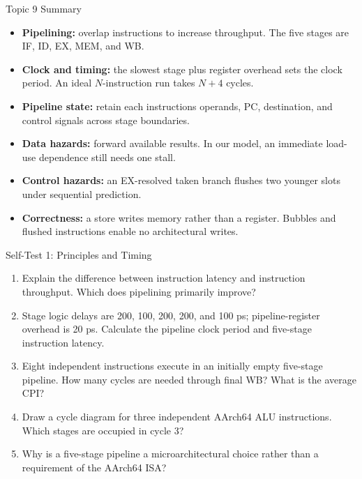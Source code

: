 \documentclass[aspectratio=169,11pt,t]{beamer}
\newcommand{\key}[1]{\textbf{#1}}
\begin{document}
\begin{frame}{Topic 9 Summary}

\begin{itemize}\setlength{\itemsep}{6pt}
  \item \key{Pipelining:} overlap instructions to increase throughput. The five stages are IF, ID, EX, MEM, and WB.
  \item \key{Clock and timing:} the slowest stage plus register overhead sets the clock period. An ideal $N$-instruction run takes $N+4$ cycles.
  \item \key{Pipeline state:} retain each instruction\textquotesingle s operands, PC, destination, and control signals across stage boundaries.
  \item \key{Data hazards:} forward available results. In our model, an immediate load-use dependence still needs one stall.
  \item \key{Control hazards:} an EX-resolved taken branch flushes two younger slots under sequential prediction.
  \item \key{Correctness:} a store writes memory rather than a register. Bubbles and flushed instructions enable no architectural writes.
\end{itemize}

\end{frame}

\begin{frame}{Self-Test 1: Principles and Timing}

\begin{enumerate}\setlength{\itemsep}{10pt}
\item Explain the difference between instruction latency and instruction throughput. Which does pipelining primarily improve?
\item Stage logic delays are 200, 100, 200, 200, and 100 ps; pipeline-register overhead is 20 ps. Calculate the pipeline clock period and five-stage instruction latency.
\item Eight independent instructions execute in an initially empty five-stage pipeline. How many cycles are needed through final WB? What is the average CPI?
\item Draw a cycle diagram for three independent AArch64 ALU instructions. Which stages are occupied in cycle 3?
\item Why is a five-stage pipeline a microarchitectural choice rather than a requirement of the AArch64 ISA?
\end{enumerate}

\end{frame}
\end{document}
